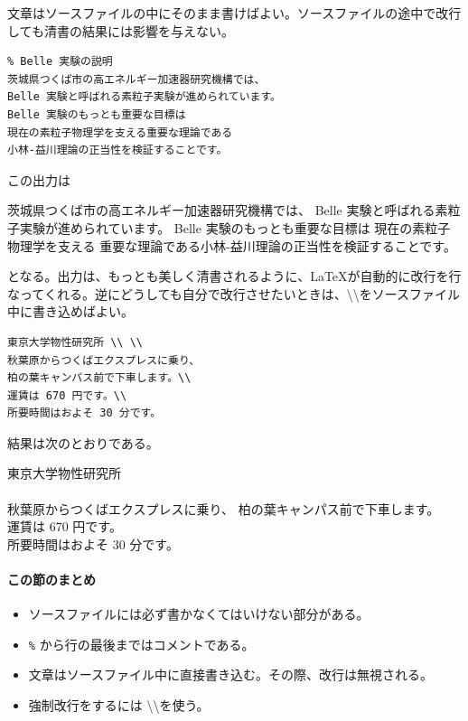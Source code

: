 文章はソースファイルの中にそのまま書けばよい。ソースファイルの途中で改行しても清書の結果には影響を与えない。
\begin{reidai}
\begin{verbatim}
% Belle 実験の説明
茨城県つくば市の高エネルギー加速器研究機構では、
Belle 実験と呼ばれる素粒子実験が進められています。
Belle 実験のもっとも重要な目標は
現在の素粒子物理学を支える重要な理論である
小林-益川理論の正当性を検証することです。
\end{verbatim}
\end{reidai}
この出力は
\begin{kekka}
茨城県つくば市の高エネルギー加速器研究機構では、
Belle 実験と呼ばれる素粒子実験が進められています。
Belle 実験のもっとも重要な目標は
現在の素粒子物理学を支える
重要な理論である小林-益川理論の正当性を検証することです。
\end{kekka} \noindent
となる。出力は、もっとも美しく清書されるように、\LaTeX が自動的に改行を行なってくれる。逆にどうしても自分で改行させたいときは、\textbackslash \textbackslash をソースファイル中に書き込めばよい。
\begin{reidai}
\begin{verbatim}
東京大学物性研究所 \\ \\
秋葉原からつくばエクスプレスに乗り、
柏の葉キャンパス前で下車します。\\
運賃は 670 円です。\\
所要時間はおよそ 30 分です。
\end{verbatim}
\end{reidai} \noindent
結果は次のとおりである。
\begin{kekka}
東京大学物性研究所 \\ \\
秋葉原からつくばエクスプレスに乗り、
柏の葉キャンパス前で下車します。\\
運賃は 670 円です。\\
所要時間はおよそ 30 分です。
\end{kekka}

\paragraph{この節のまとめ}

\begin{itemize}
\item ソースファイルには必ず書かなくてはいけない部分がある。
\item \texttt{\%} から行の最後まではコメントである。
\item 文章はソースファイル中に直接書き込む。その際、改行は無視される。
\item 強制改行をするには \textbackslash \textbackslash を使う。
\end{itemize}



